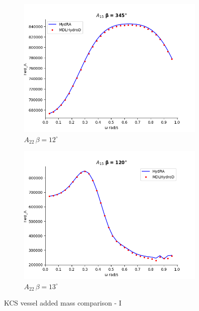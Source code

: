 \begin{figure}[H]
\begin{subfigure}[b]{0.45\textwidth}
        \includegraphics[width=\textwidth]{plots/kcs/added_mass/A15 _BETA_345.png}
        \caption{$A_{22} \, \beta = 12^{\circ}$}
    \end{subfigure}
    \begin{subfigure}[b]{0.45\textwidth}
        \includegraphics[width=\textwidth]{plots/kcs/added_mass/A15_BETA_120.png}
        \caption{$A_{22} \, \beta = 13^{\circ}$}
    \end{subfigure}
    \caption{KCS vessel added mass comparison - I}
    \label{fig:kcs_addedmass_1}
\end{figure}

